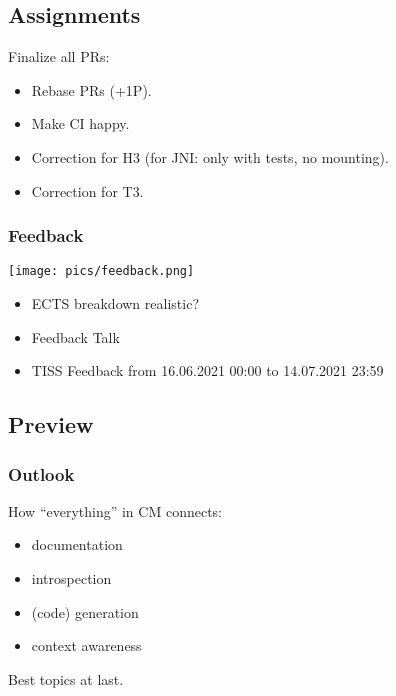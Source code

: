 \subsection{Assignments}

\begin{assignment}
	Finalize all PRs:

	\begin{itemize} %
	\item Rebase PRs (+1P).
	\item Make CI happy.
	\item Correction for H3 (for JNI: only with tests, no mounting).
	\item Correction for T3.
	\end{itemize}
\end{assignment}

\begin{frame}
	\frametitle{Feedback}
	\hfill \texttt{[image: pics/feedback.png]}
	\vspace{-1cm}
	\begin{itemize}
		\item ECTS breakdown realistic?
		\item Feedback Talk
		\item TISS Feedback from 16.06.2021 00:00 to 14.07.2021 23:59
	\end{itemize}
\end{frame}

\subsection{Preview}

\begin{frame}
	\frametitle{Outlook}

	How ``everything'' in CM connects:
	\begin{itemize} %
	\item documentation
	\item introspection
	\item (code) generation
	\item context awareness
	\end{itemize}
	Best topics at last.
\end{frame}



\nocite{raab2017introducing}

\appendix

\begin{frame}[allowframebreaks]
	
	
\end{frame}



